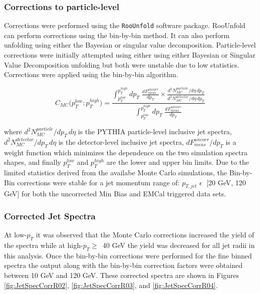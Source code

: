 \subsubsection{Corrections to particle-level}

Corrections were performed using the \verb+RooUnfold+\cite{Adye:2011gm} software package.  RooUnfold can perform corrections using the bin-by-bin method.  It can also perform unfolding using either the Bayesian or singular value decomposition.  Particle-level corrections were initially attempted using either using either Bayesian or Singular Value Decomposition unfolding but both were unstable due to low statistics. Corrections were applied using the bin-by-bin\cite{Cowan:2002in} algorithm. 

\begin{equation}
C_{MC} \big( p_{T}^{low} : p_{T}^{high} \big) =  \frac{  \int^{p_{T}^{high}}_{p_{T}^{low}} dp_{T} \; \frac{dF^{uncorr}_{meas}}{dp_{T}} \times \frac{d^{2}N^{particle}_{MC}/d\eta \, dp_{T}}{d^{2}N^{detector}_{MC}/d\eta \, dp_{T}}  } { \int^{p_{T}^{high}}_{p_{T}^{low}} dp_{T} \; \frac{dF^{uncorr}_{meas}}{dp_{T}} }
\label{eq:binbybin}
\end{equation}

\noindent
where $d^{2}N^{particle}_{MC}/dp_{T} \, d\eta$ is the PYTHIA particle-level inclusive jet spectra, $d^{2}N^{detector}_{MC}/dp_{T} \, d\eta$ is the detector-level inclusive jet spectra, $dF^{uncorr}_{meas} / dp_{T}$ is a weight function which minimizes the dependence on the two simulation spectra shapes, and finally $p_{T}^{low}$ and $p_{T}^{high}$ are the lower and upper bin limits.  Due to the limited statistics derived from the availabe Monte Carlo simulations, the Bin-by-Bin corrections were stable for a jet momentum range of: $p_{T,jet} \, \, \epsilon \;$ [20 GeV, 120 GeV] for both the uncorrected Min Bias and EMCal triggered data sets.  

\subsubsection{Corrected Jet Spectra}


At low-$p_{T}$ it was observed that the Monte Carlo corrections increased the yield of the spectra while at high-$p_{T} \geq \,$ 40 GeV the yield was decreased for all jet radii in this analysis.  Once the bin-by-bin corrections were performed for the fine binned spectra the output along with the bin-by-bin correction factors were obtained between 10 GeV and 120 GeV.  These corrected spectra are shown in Figures \ref{fig:JetSpecCorrR02}, \ref{fig:JetSpecCorrR03}, and \ref{fig:JetSpecCorrR04}.

